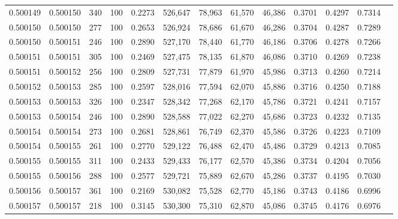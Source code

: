 \begin{tabular}{rrrrrrrrrrrrr}
0.500149 & 0.500150 &   340 & 100 &                                     0.2273 & 526,647 &  78,963 &  61,570 &  46,386 & 0.3701 & 0.4297 & 0.7314 \\
0.500150 & 0.500150 &   277 & 100 &                                     0.2653 & 526,924 &  78,686 &  61,670 &  46,286 & 0.3704 & 0.4287 & 0.7289 \\
0.500150 & 0.500151 &   246 & 100 &                                     0.2890 & 527,170 &  78,440 &  61,770 &  46,186 & 0.3706 & 0.4278 & 0.7266 \\
0.500151 & 0.500151 &   305 & 100 &                                     0.2469 & 527,475 &  78,135 &  61,870 &  46,086 & 0.3710 & 0.4269 & 0.7238 \\
0.500151 & 0.500152 &   256 & 100 &                                     0.2809 & 527,731 &  77,879 &  61,970 &  45,986 & 0.3713 & 0.4260 & 0.7214 \\
0.500152 & 0.500153 &   285 & 100 &                                     0.2597 & 528,016 &  77,594 &  62,070 &  45,886 & 0.3716 & 0.4250 & 0.7188 \\
0.500153 & 0.500153 &   326 & 100 &                                     0.2347 & 528,342 &  77,268 &  62,170 &  45,786 & 0.3721 & 0.4241 & 0.7157 \\
0.500153 & 0.500154 &   246 & 100 &                                     0.2890 & 528,588 &  77,022 &  62,270 &  45,686 & 0.3723 & 0.4232 & 0.7135 \\
0.500154 & 0.500154 &   273 & 100 &                                     0.2681 & 528,861 &  76,749 &  62,370 &  45,586 & 0.3726 & 0.4223 & 0.7109 \\
0.500154 & 0.500155 &   261 & 100 &                                     0.2770 & 529,122 &  76,488 &  62,470 &  45,486 & 0.3729 & 0.4213 & 0.7085 \\
0.500155 & 0.500155 &   311 & 100 &                                     0.2433 & 529,433 &  76,177 &  62,570 &  45,386 & 0.3734 & 0.4204 & 0.7056 \\
0.500155 & 0.500156 &   288 & 100 &                                     0.2577 & 529,721 &  75,889 &  62,670 &  45,286 & 0.3737 & 0.4195 & 0.7030 \\
0.500156 & 0.500157 &   361 & 100 &                                     0.2169 & 530,082 &  75,528 &  62,770 &  45,186 & 0.3743 & 0.4186 & 0.6996 \\
0.500157 & 0.500157 &   218 & 100 &                                     0.3145 & 530,300 &  75,310 &  62,870 &  45,086 & 0.3745 & 0.4176 & 0.6976 \\

\end{tabular}
